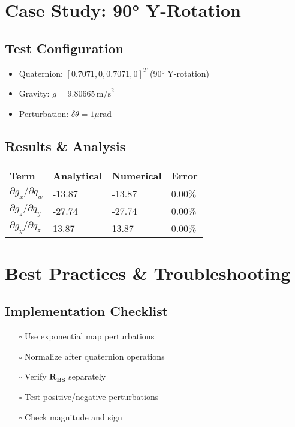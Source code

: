 \documentclass{article}
\begin{document}
\section{Case Study: 90° Y-Rotation}
\label{sec:case_study}

\subsection{Test Configuration}
\begin{itemize}
	\item Quaternion: $[0.7071, 0, 0.7071, 0]^T$ (90° Y-rotation)
	\item Gravity: $g = 9.80665\,\text{m/s}^2$
	\item Perturbation: $\delta\theta = 1\mu\text{rad}$
\end{itemize}

\subsection{Results \& Analysis}
\begin{tabular}{llll}
	Term & Analytical & Numerical & Error \\
	\midrule
	$\partial g_x/\partial q_w$ & -13.87 & -13.87 & 0.00\% \\
	$\partial g_z/\partial q_y$ & -27.74 & -27.74 & 0.00\% \\
	$\partial g_y/\partial q_z$ & 13.87 & 13.87 & 0.00\% \\
\end{tabular}

\section{Best Practices \& Troubleshooting}
\label{sec:best_practices}

\subsection{Implementation Checklist}
\begin{itemize}
	\item [$\square$] Use exponential map perturbations
	\item [$\square$] Normalize after quaternion operations
	\item [$\square$] Verify $\mathbf{R_{BS}}$ separately
	\item [$\square$] Test positive/negative perturbations
	\item [$\square$] Check magnitude and sign
\end{itemize}
\end{document}
